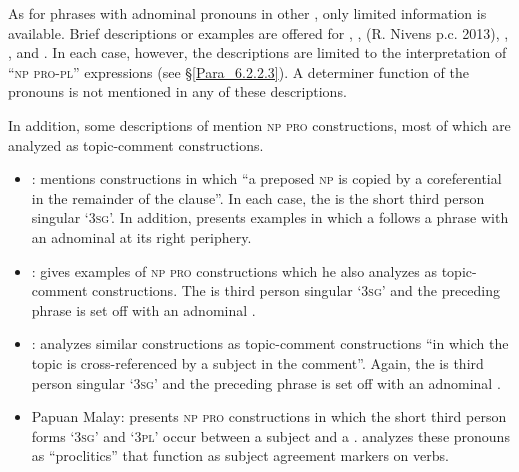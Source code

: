 As for  phrases with adnominal pronouns in other , only limited information is available. Brief descriptions or examples are offered for  \citep{vanMinde.1997},  \citep{Tadmor.2002},   (R. Nivens p.c. 2013),  \citep{Grimes.2008},  \citep{Stoel.2005}, and  \citep{Slomanson.2013}. In each case, however, the descriptions are limited to the  interpretation of ``\textsc{np} \textsc{pro-pl}'' expressions (see §\ref{Para_6.2.2.3}). A determiner function of the pronouns is not mentioned in any of these descriptions.



In addition, some descriptions of  mention \textsc{np} \textsc{pro} constructions, most of which are analyzed as topic-comment constructions.


\begin{itemize}
\item 
{}: \citet[284]{vanMinde.1997} mentions constructions in which “a preposed \textsc{np} is copied by a coreferential  in the remainder of the clause”. In each case, the  is the short third person singular  ‘\textsc{3sg}’. In addition, \citet[285]{vanMinde.1997} presents examples in which a  follows a  phrase with an adnominal  at its right periphery. 

\item 
{}: \citet[165]{Paauw.2009} gives examples of \textsc{np} \textsc{pro} constructions which he also analyzes as topic-comment constructions. The  is third person singular  ‘\textsc{3sg}’ and the preceding  phrase is set off with an adnominal .

\item 
{}: \citet[5]{Voorhoeve.1983} analyzes similar constructions as topic-comment constructions “in which the topic is cross-refer\-enced by a  subject in the comment”. Again, the  is third person singular  ‘\textsc{3sg}’ and the preceding  phrase is set off with an adnominal .

\item 
Papuan Malay: \citet[166–168]{Paauw.2009} presents \textsc{np} \textsc{pro} constructions in which the short third person forms  ‘\textsc{3sg}’ and  ‘\textsc{3pl}’ occur between a subject and a . \citet{Paauw.2009} analyzes these pronouns as “proclitics” that function as subject agreement markers on verbs.

\end{itemize}

